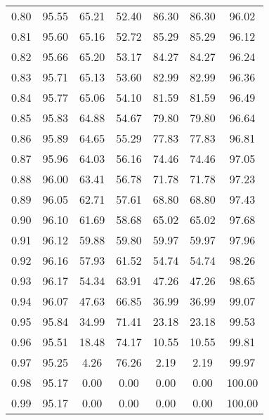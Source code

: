 \begin{tabular}{|c|c|c|c|c|c|c|}
      0.80 &     95.55 &     65.21 &      52.40 &   86.30 &      86.30 &         96.02 \\
      0.81 &     95.60 &     65.16 &      52.72 &   85.29 &      85.29 &         96.12 \\
      0.82 &     95.66 &     65.20 &      53.17 &   84.27 &      84.27 &         96.24 \\
      0.83 &     95.71 &     65.13 &      53.60 &   82.99 &      82.99 &         96.36 \\
      0.84 &     95.77 &     65.06 &      54.10 &   81.59 &      81.59 &         96.49 \\
      0.85 &     95.83 &     64.88 &      54.67 &   79.80 &      79.80 &         96.64 \\
      0.86 &     95.89 &     64.65 &      55.29 &   77.83 &      77.83 &         96.81 \\
      0.87 &     95.96 &     64.03 &      56.16 &   74.46 &      74.46 &         97.05 \\
      0.88 &     96.00 &     63.41 &      56.78 &   71.78 &      71.78 &         97.23 \\
      0.89 &     96.05 &     62.71 &      57.61 &   68.80 &      68.80 &         97.43 \\
      0.90 &     96.10 &     61.69 &      58.68 &   65.02 &      65.02 &         97.68 \\
      0.91 &     96.12 &     59.88 &      59.80 &   59.97 &      59.97 &         97.96 \\
      0.92 &     96.16 &     57.93 &      61.52 &   54.74 &      54.74 &         98.26 \\
      0.93 &     96.17 &     54.34 &      63.91 &   47.26 &      47.26 &         98.65 \\
      0.94 &     96.07 &     47.63 &      66.85 &   36.99 &      36.99 &         99.07 \\
      0.95 &     95.84 &     34.99 &      71.41 &   23.18 &      23.18 &         99.53 \\
      0.96 &     95.51 &     18.48 &      74.17 &   10.55 &      10.55 &         99.81 \\
      0.97 &     95.25 &      4.26 &      76.26 &    2.19 &       2.19 &         99.97 \\
      0.98 &     95.17 &      0.00 &       0.00 &    0.00 &       0.00 &        100.00 \\
      0.99 &     95.17 &      0.00 &       0.00 &    0.00 &       0.00 &        100.00 \\
\bottomrule
\end{tabular}
